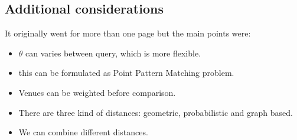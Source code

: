 \subsection*{Additional considerations}
\begin{comments}
    It originally went for more than one page but the main points were:
    \begin{itemize}
        \item $\theta$ can varies between query, which is more flexible.
        \item this can be formulated as Point Pattern Matching problem.
        \item Venues can be weighted before comparison.
        \item There are three kind of distances: geometric, probabilistic and
            graph based.
        \item We can combine different distances.
    \end{itemize}
\end{comments}

